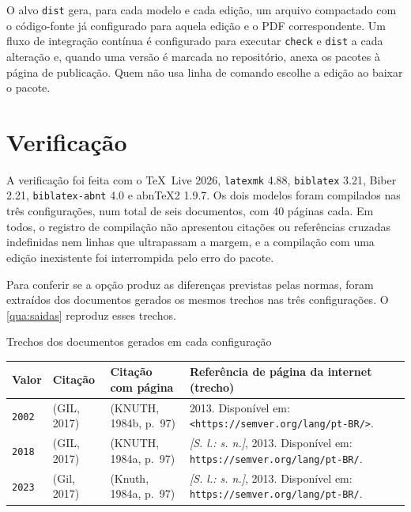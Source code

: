 \documentclass[
	article,
	12pt,
	oneside,
	a4paper,
	english,
	brazil,
]{abntex2}
\begin{document}
O alvo \texttt{dist} gera, para cada modelo e cada edição, um arquivo compactado com o código-fonte já configurado para aquela edição e o PDF correspondente. Um fluxo de integração contínua é configurado para executar \texttt{check} e \texttt{dist} a cada alteração e, quando uma versão é marcada no repositório, anexa os pacotes à página de publicação. Quem não usa linha de comando escolhe a edição ao baixar o pacote.

\section{Verificação}\label{sec:verificacao}

A verificação foi feita com o \TeX\ Live 2026, \texttt{latexmk} 4.88, \texttt{biblatex} 3.21, Biber 2.21, \texttt{biblatex-abnt} 4.0 e abn\TeX2 1.9.7. Os dois modelos foram compilados nas três configurações, num total de seis documentos, com 40 páginas cada. Em todos, o registro de compilação não apresentou citações ou referências cruzadas indefinidas nem linhas que ultrapassam a margem, e a compilação com uma edição inexistente foi interrompida pelo erro do pacote.

Para conferir se a opção produz as diferenças previstas pelas normas, foram extraídos dos documentos gerados os mesmos trechos nas três configurações. O \autoref{qua:saidas} reproduz esses trechos.

\begin{quadro}[htbp]
	\caption{Trechos dos documentos gerados em cada configuração}\label{qua:saidas}
	\centering
	\footnotesize
	\begin{tabular}{L{0.07\textwidth}L{0.14\textwidth}L{0.24\textwidth}L{0.41\textwidth}}
		\toprule
		\textbf{Valor} & \textbf{Citação} & \textbf{Citação com página} & \textbf{Referência de página da internet (trecho)} \\
		\midrule
		\texttt{2002} & (GIL, 2017) & (KNUTH, 1984b, p.~97) & 2013. Disponível em: \texttt{<https://semver.org/lang/pt-BR/>}. \\
		\texttt{2018} & (GIL, 2017) & (KNUTH, 1984a, p.~97) & \textit{[S. l.: s. n.]}, 2013. Disponível em: \texttt{https://semver.org/lang/pt-BR/}. \\
		\texttt{2023} & (Gil, 2017) & (Knuth, 1984a, p.~97) & \textit{[S. l.: s. n.]}, 2013. Disponível em: \texttt{https://semver.org/lang/pt-BR/}. \\
		\bottomrule
	\end{tabular}
\end{quadro}
\end{document}
